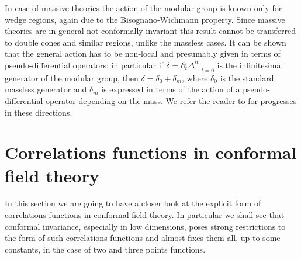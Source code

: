 \bigskip
In case of massive theories the action of the modular group 
is known only for wedge regions, again due to the 
Bisognano-Wichmann property. Since massive theories are in
general not conformally invariant this result cannot be transferred
to double cones and similar regions, unlike the massless cases.
It can be shown that the general action has to be non-local and
presumably given in terms of pseudo-differential operators; 
in particular if $\delta=\partial_t \Delta^{it}|_{t=0}$ is the 
infinitesimal generator of the modular group, then 
$\delta=\delta_{0} + \delta_m$, where $\delta_0$ is the standard
massless generator and $\delta_m$ is expressed in terms of the
action of a pseudo-differential operator depending on the mass.
We refer the reader to \cite{Saf:2006, Yngv} for progresses
in these directions.



\section{Correlations functions in conformal field theory}
\label{correlations functions}
\noindent In this section we are going to have a closer look at
the explicit form of correlations functions in
conformal field theory. In particular we shall see
that conformal invariance, especially in low dimensions,
poses strong restrictions to the form of such 
correlations functions and almost fixes them all, 
up to some constants, in the case of two and three
points functions.

